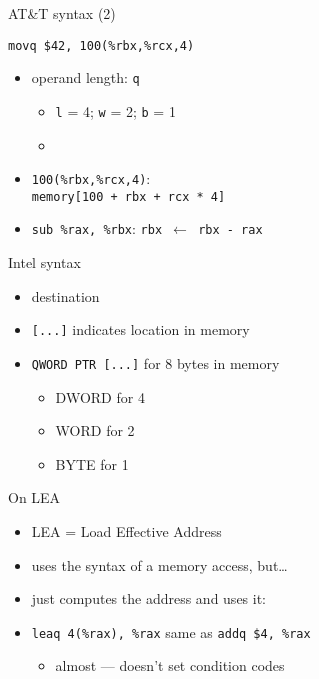 \begin{frame}[fragile,label=att2]{AT\&T syntax (2)}
\begin{lstlisting}
movq $42, 100(%rbx,%rcx,4)
\end{lstlisting}
    \begin{itemize}
    \item operand length: {\tt q}
        \begin{itemize}
        \item {\tt l} = 4; {\tt w} = 2; {\tt b} = 1
        \item 
        \end{itemize}
    \item {\tt 100(\%rbx,\%rcx,4)}: \\ {\tt memory[100 + rbx + rcx * 4]}
    \item {\tt sub \%rax, \%rbx}: {\tt rbx $\leftarrow$ rbx - rax}
    \end{itemize}
\end{frame}

\begin{frame}{Intel syntax}
    \begin{itemize}
    \item destination 
    \item {\tt [...]} indicates location in memory
    \item {\tt QWORD PTR [...]} for 8 bytes in memory
        \begin{itemize}
        \item DWORD for 4
        \item WORD for 2
        \item BYTE for 1
        \end{itemize}
    \end{itemize}
\end{frame}

\begin{frame}[fragile,label=LEA]{On LEA}
    \begin{itemize}
    \item LEA = Load Effective Address
    \item uses the syntax of a memory access, but\ldots{}
    \item just computes the address and uses it:
    \item {}\lstinline|leaq 4(%rax), %rax| same as \lstinline|addq $4, %rax|
        \begin{itemize}
        \item almost --- doesn't set condition codes
        \end{itemize}
    \end{itemize}
\end{frame}

